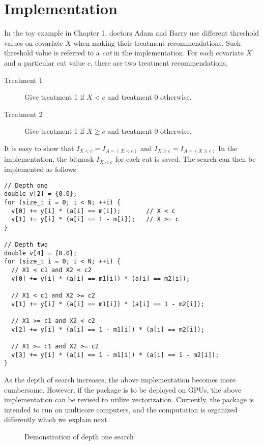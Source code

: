\chapter{Implementation}

In the toy example in Chapter 1, doctors Adam and Barry use different threshold
values on covariate $X$ when making their treatment recommendations. Such
threshold value is referred to a {\it cut} in the implementation. For each
covariate $X$ and a particular cut value $c$, there are two treatment
recommendations, 
\begin{description}
\item[Treatment 1] Give treatment 1 if $X < c$ and treatment 0 otherwise.
\item[Treatment 2] Give treatment 1 if $X \geq c$ and treatment 0 otherwise. 
\end{description}
It is easy to show that $I_{X < c} = I_{A = (X < c)}$ and
$I_{X \geq c} = I_{A = (X \geq c)}$ In the implementation, the bitmask $I_{X<c}$
for each cut is saved.  The  search can then be implemented as follows

\begin{verbatim}
// Depth one 
double v[2] = {0.0}; 
for (size_t i = 0; i < N; ++i) {
  v[0] += y[i] * (a[i] == m[i]);       // X < c
  v[1] += y[i] * (a[i] == 1 - m[i]);   // X >= c
}

// Depth two 
double v[4] = {0.0}; 
for (size_t i = 0; i < N; ++i) {
  // X1 < c1 and X2 < c2
  v[0] += y[i] * (a[i] == m1[i]) * (a[i] == m2[i]); 
  
  // X1 < c1 and X2 >= c2
  v[1] += y[i] * (a[i] == m1[i]) * (a[i] == 1 - m2[i]);

  // X1 >= c1 and X2 < c2
  v[2] += y[i] * (a[i] == 1 - m1[i]) * (a[i] == m2[i]);

  // X1 >= c1 and X2 >= c2 
  v[3] += y[i] * (a[i] == 1 - m1[i]) * (a[i] == 1 - m2[i]);
}
\end{verbatim}

As the depth of search increases, the above implementation becomes
more cumbersome. However, if the package is to be deployed on GPUs,
the above implementation can be revised to utilize vectorization.
Currently, the package is intended to run on multicore computers, and the
computation is organized differently which we explain next.

\begin{figure}[h]
  \centering
  \caption{Demonstration of depth one search}
  \label{fig:depth1}
\end{figure}


